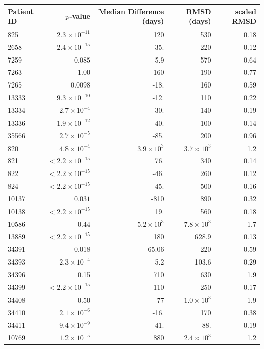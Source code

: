 \documentclass[12pt]{article}
\newcommand{\badpat}[1]{\rowcolor{badpatcol}#1}
\begin{document}
\begin{table}[!ht]
\def\arraystretch{1.3}%
\begin{center}
\begin{tabular}{lrrrr} 
Patient ID & $p$-value & Median Difference (days) & RMSD (days) & scaled RMSD \\ 
\hline
825 & $2.3 \times 10^{-11}$ & 120 & 530 & 0.18 \\
2658 & $2.4 \times 10^{-15}$  & -35. & 220 & 0.12 \\
\badpat{7259 & $0.085$ & -5.9 & 570 & 0.64} \\
\badpat{7263 & $1.00$ & 160 & 190 & 0.77} \\
7265 & $0.0098$ & -18. & 160 & 0.59 \\
13333 & $9.3 \times 10^{-10}$ & -12. & 110 & 0.22 \\
13334 & $2.7 \times 10^{-4}$ & -30. & 140 & 0.19 \\
13336 & $1.9 \times 10^{-12}$ & 40. & 100 & 0.14 \\
35566 & $2.7 \times 10^{-5}$ & -85. & 200 & 0.96 \\
\hline
820 & $4.8 \times 10^{-4}$ & $3.9 \times 10^{3}$ & $3.7 \times 10^{3}$ & 1.2 \\
821 & $< 2.2 \times 10^{-15}$ &76. & 340 & 0.14 \\
822 & $< 2.2 \times 10^{-15}$ & -46. & 260 & 0.12 \\
824 & $< 2.2 \times 10^{-15}$ & -45. & 500 & 0.16 \\
\badpat{10137 & $0.031$ & -810 & 890 & 0.32} \\
10138 & $< 2.2 \times 10^{-15}$ & 19. & 560 & 0.18 \\
\badpat{10586 & $0.44$ & $-5.2 \times 10^3$ & $7.8 \times 10^{3}$ & 1.7} \\
13889 & $< 2.2 \times 10^{-15}$ & 180 & 628.9 & 0.13 \\
\badpat{34391 & 0.018 & 65.06 & 220 & 0.59} \\
34393 & $2.3 \times 10^{-4}$ & 5.2 & 103.6 & 0.29 \\
\badpat{34396 & 0.15 & 710 & 630 & 1.9} \\
34399 & $< 2.2 \times 10^{-15}$ & 110 & 250 & 0.17 \\
\badpat{34408 & 0.50 & 77 & $1.0 \times 10^{3}$ & 1.9} \\
34410 & $2.1 \times 10^{-6}$ & -16. & 170 & 0.38 \\
34411 & $9.4 \times 10^{-9}$ & 41. & 88. & 0.19 \\
10769 & $1.2 \times 10^{-5}$ & 880 & $2.4 \times 10^3$ & 1.2 \\

\end{tabular}
\end{center}
\end{table}
\end{document}
